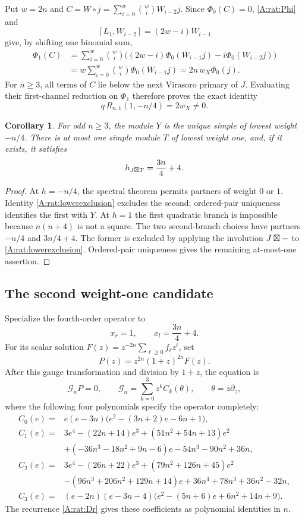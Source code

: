 \documentclass[11pt]{article}
\newtheorem{corollary}[theorem]{Corollary}
\numberwithin{equation}{section}
\begin{document}
Put $w=2n$ and $C=W\circ j=\sum_{i=0}^w\binom wi W_{i-2}j$. Since $\Phi_0(C)=0$, \eqref{A:rat:Phi} and
\[
 [L_1,W_{i-2}]=(2w-i)W_{i-1}
\]
give, by shifting one binomial sum,
\begin{align*}
 \Phi_1(C)
 &=\sum_{i=0}^w\binom wi
       \bigl((2w-i)\Phi_0(W_{i-1}j)-i\Phi_0(W_{i-2}j)\bigr)\\
 &=w\sum_{i=0}^w\binom wi\Phi_0(W_{i-1}j)
 =2n\,w_X\Phi_0(j).
\end{align*}
For $n\geq3$, all terms of $C$ lie below the next Virasoro primary of $J$. Evaluating their first-channel reduction on $\Phi_1$ therefore proves the exact identity
\begin{equation}\label{A:rat:lowerexclusion}
 q\,R_{n,1}(1,-n/4)=2w_X\ne0.
\end{equation}


\begin{corollary}\label{A:rat:onepair}
For odd $n\geq3$, the module $Y$ is the unique simple of lowest weight $-n/4$. There is at most one simple module $T$ of lowest weight one, and, if it exists, it satisfies
\[
 h_{J\boxtimes T}=\frac{3n}{4}+4.
\]
\end{corollary}
\begin{proof}
At $h=-n/4$, the spectral theorem permits partners of weight $0$ or $1$. Identity \eqref{A:rat:lowerexclusion} excludes the second; ordered-pair uniqueness identifies the first with $Y$. At $h=1$ the first quadratic branch is impossible because $n(n+4)$ is not a square. The two second-branch choices have partners $-n/4$ and $3n/4+4$. The former is excluded by applying the involution $J\boxtimes-$ to \eqref{A:rat:lowerexclusion}. Ordered-pair uniqueness gives the remaining at-most-one assertion.
\end{proof}

\subsection{The second weight-one candidate}
Specialize the fourth-order operator to
\[
 x_r=1,\qquad x_l=\frac{3n}{4}+4.
\]
For its scalar solution $F(z)=z^{-2n}\sum_{\ell\geq0}f_\ell z^\ell$, set
\[
 P(z)=z^{2n}(1+z)^{2n}F(z).
\]
After this gauge transformation and division by $1+z$, the equation is
\begin{equation}\label{A:rat:gauged}
 \mathcal G_n P=0,\qquad
 \mathcal G_n=\sum_{k=0}^3 z^k C_k(\theta),\qquad \theta=z\partial_z,
\end{equation}
where the following four polynomials specify the operator completely:
\begin{align*}
 C_0(e)={}&e(e-3n)\bigl(e^2-(3n+2)e-6n+1\bigr),\\
 C_1(e)={}&3e^4-(22n+14)e^3+(51n^2+54n+13)e^2\\
          &+(-36n^3-18n^2+9n-6)e-54n^3-90n^2+36n,\\
 C_2(e)={}&3e^4-(26n+22)e^3+(79n^2+126n+45)e^2\\
          &-(96n^3+206n^2+129n+14)e+36n^4+78n^3+36n^2-32n,\\
 C_3(e)={}&(e-2n)(e-3n-4)
                  \bigl(e^2-(5n+6)e+6n^2+14n+9\bigr).
\end{align*}
The recurrence \eqref{A:rat:Dr} gives these coefficients as polynomial identities in $n$.
\end{document}
